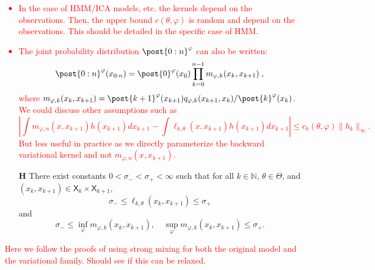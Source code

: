 \documentclass{article}
\newcommand{\uksymbol}{\ell}
\newcommand{\udlow}{\sigma_-}
\newcommand{\udup}{\sigma_+}
\newcommand{\ud}[1]{\uksymbol_{#1}}
\newcommand{\nset}{\mathbb{N}}
\newcommand{\1}{\mathbbm{1}}
\newcommand{\Xset}{\mathsf{X}}
\newcommand{\parvec}{\theta}
\newcommand{\eqdef}{\ensuremath{:=}}
\newcommand{\eqsp}{\;}
\newcounter{hypH}
\newenvironment{hypH}{\refstepcounter{hypH}\begin{itemize}
\item[{\bf H\arabic{hypH}}]}{\end{itemize}}
\newcommand{\qg}[1]{\ell_{#1}}
\begin{document}
\textcolor{red}{
\begin{itemize}
\item In the case of HMM/ICA models, etc. the kernels depend on the observations. Then, the upper bound $c(\parvec,\varphi)$ is random and depend on the observations. This should be detailed in the specific case of HMM.
\item The joint probability distribution $\post{0:n}^{\varphi}$ can also be written:
$$
 \post{0:n}^{\varphi}(x_{0:n})=  \post{0}^{\varphi}(x_0)\prod_{k=0}^{n-1}m_{\varphi,k}(x_{k},x_{k+1})\eqsp,
$$
where $m_{\varphi,k}(x_{k},x_{k+1}) =   \post{k+1}^{\varphi}(x_{k+1})q_{\varphi,k}(x_{k+1},x_k)/ \post{k}^{\varphi}(x_k)$. We could discuss other assumptions such as 
$$
\left|\int m_{\varphi,n}(x,x_{k+1}) h (x_{k+1})dx_{k+1}- \int\qg{k,\parvec}(x,x_{k+1}) h (x_{k+1})dx_{k+1}\right| \leqslant c_k(\parvec,\varphi) \| h_k \|_\infty. 
$$
But less useful in practice as we directly parameterize the backward variational kernel and not $ m_{\varphi,n}(x,x_{k+1}) $.
\end{itemize}}

\begin{hypH}
\label{assum:strong:mixing}
There exist constants $0 < \udlow < \udup < \infty$ such that for all $k \in \nset$, $\theta\in\Theta$, and $(x_k, x_{k + 1}) \in \Xset_k \times \Xset_{k + 1}$, 
$$
    \udlow \leq \ud{k,\theta}(x_k, x_{k + 1}) \leq \udup
$$ 
and 
$$
    \udlow \leq \inf_{\varphi} m_{\varphi,k}(x_k, x_{k + 1}), \quad \sup_{\varphi} m_{\varphi,k}(x_k, x_{k + 1}) \leq \udup. 
$$ 
\end{hypH}
\textcolor{red}{Here we follow the proofs of \cite{gloaguen2019pseudo} using strong mixing for both the original model and the variational family. Should see if this can be relaxed.}
\end{document}
